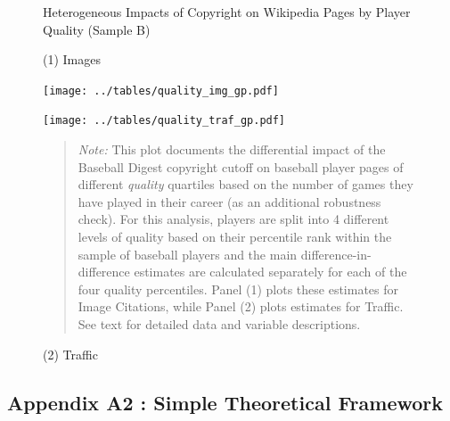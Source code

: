 \begin{figure}[!htbp]
\begin{center}
\caption{Heterogeneous Impacts of Copyright on Wikipedia Pages by Player Quality (Sample B)}
\label{fig:quality_alternate}
\vspace{5mm}
\caption*{\small{(1) Images}}
\texttt{[image: ../tables/quality\_img\_gp.pdf]}\\
\vspace{5mm}
\caption*{\small{(2) Traffic}}
\texttt{[image: ../tables/quality\_traf\_gp.pdf]}

\end{center}
\begin{quote}
\emph{Note:} This plot documents the differential impact of the Baseball Digest copyright cutoff on baseball player pages of different \emph{quality} quartiles based on the number of games they have played in their career (as an additional robustness check). For this analysis, players are split into 4 different levels of quality based on their percentile rank within the sample of baseball players and the main difference-in-difference estimates are calculated separately for each of the four quality percentiles. Panel (1) plots these estimates for Image Citations, while Panel (2) plots estimates for Traffic. See text for detailed data and variable descriptions.




\end{quote}
\end{figure}




\newpage
\FloatBarrier

\subsection{Appendix A2 : Simple Theoretical Framework}
\label{sec:theory}







